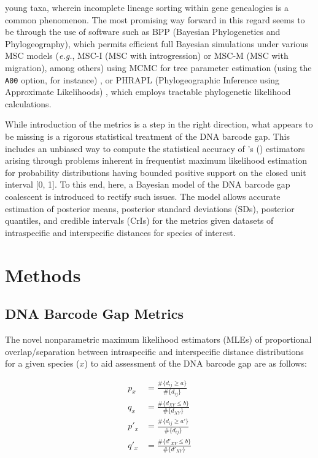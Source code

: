 \documentclass[12pt]{article}
\begin{document}
young taxa, wherein incomplete lineage sorting within gene genealogies is a common phenomenon.  The most promising way forward in this regard seems to be through the use of software such as BPP (Bayesian Phylogenetics and Phylogeography), which permits efficient full Bayesian simulations under various MSC models (\textit{e.g.}, MSC-I (MSC with introgression) or MSC-M (MSC with migration), among others) using MCMC for tree parameter estimation (using the {\tt A00} option, for instance) \citep{flouri2018species}, or PHRAPL (Phylogeographic Inference using Approximate Likelihoods) \citep{jackson2017phrapl}, which employs tractable phylogenetic likelihood calculations. 

While introduction of the metrics is a step in the right direction, what appears to be missing is a rigorous statistical treatment of the DNA barcode gap. This includes an unbiased way to compute the statistical accuracy of \citeauthor{phillips2024measure}'s (\citeyear{phillips2024measure}) estimators arising through problems inherent in frequentist maximum likelihood estimation for probability distributions having bounded positive support on the closed unit interval [0, 1]. To this end, here, a Bayesian model of the DNA barcode gap coalescent is introduced to rectify such issues. The model allows accurate estimation of posterior means, posterior standard deviations (SDs), posterior quantiles, and credible intervals (CrIs) for the metrics given datasets of intraspecific and interspecific distances for species of interest.

\section{Methods}

\subsection{DNA Barcode Gap Metrics}

The novel nonparametric maximum likelihood estimators (MLEs) of proportional \\ overlap/separation between intraspecific and interspecific distance distributions for a given species ($x$) to aid assessment of the DNA barcode gap are as follows:

\begin{align}
p_x &= \frac{\#\{d_{ij} \geq a\}}{\#\{d_{ij}\}} \\[1mm]
q_x &= \frac{\#\{d_{XY} \leq b\}}{\#\{d_{XY}\}} \\[1mm]
p'_x &= \frac{\#\{d_{ij} \geq a'\}}{\#\{d_{ij}\}} \\[1mm]
q'_x &= \frac{\#\{d'_{XY} \leq b\}}{\#\{d'_{XY}\}}
\end{align}
\end{document}
